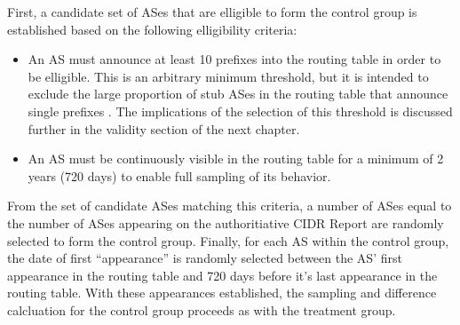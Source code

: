 First, a candidate set of ASes that are elligible to form the control group is established based on the following elligibility criteria:
\begin{itemize}
\item{An AS must announce at least 10 prefixes into the routing table in order to be elligible. This is an arbitrary minimum threshold, but it is intended to exclude the large proportion of stub ASes in the routing table that announce single prefixes \cite{6447-table-report}. The implications of the selection of this threshold is discussed further in the validity section of the next chapter.}
\item{An AS must be continuously visible in the routing table for a minimum of 2 years (720 days) to enable full sampling of its behavior.}
\end{itemize}

From the set of candidate ASes matching this criteria, a number of ASes equal to the number of ASes appearing on the authoritiative CIDR Report are randomly selected to form the control group. Finally, for each AS within the control group, the date of first ``appearance'' is randomly selected between the AS' first appearance in the routing table and 720 days before it's last appearance in the routing table. With these appearances established, the sampling and difference calcluation for the control group proceeds as with the treatment group.


